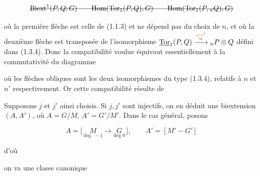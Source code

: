 \[\deleted{\mathrm{Biext}^1(P,Q;G)\qquad\mathrm{Hom}(\mathrm{Tor}_1(P,Q),G)\qquad\mathrm{Hom}(\mathrm{Tor}_1(P,{}_nQ),G)}\]

où la première flèche est celle de (1.1.3) et ne dépend pas du choix de $n$, et où la deuxième flèche est transposée de l'isomorphisme $\underline{\mathrm{Tor}}_1(P,Q)\handwritten{\xrightarrow{\overset{\unsure{\partial|d}}{\sim}}}{}_nP\otimes Q$ défini dans (1.3.4). Donc la compatibilité voulue équivaut essentiellement à  la commutativité du diagramme


où les flèches obliques sont les deux isomorphismes du type (1.3.4), relatifs à $n$ et $n'$ respectivement. Or cette compatibilité résulte de
\endgroup


Supposons $j$ et $j'$ ainsi choisis. Si $j,j'$ sont injectifs, on en déduit une biextension   $(A,A')$, où $A=G/M$, $A'=G'/M'$. Dans le cas général, posons


\[ A=\bigl[\,\underset{\text{deg. }-1}{M}\longrightarrow\underset{\text{deg }0}{G}\,\bigr],\qquad A'=[M'\mathbin{-}G'] \]

d'où

on va  une  classe canonique

